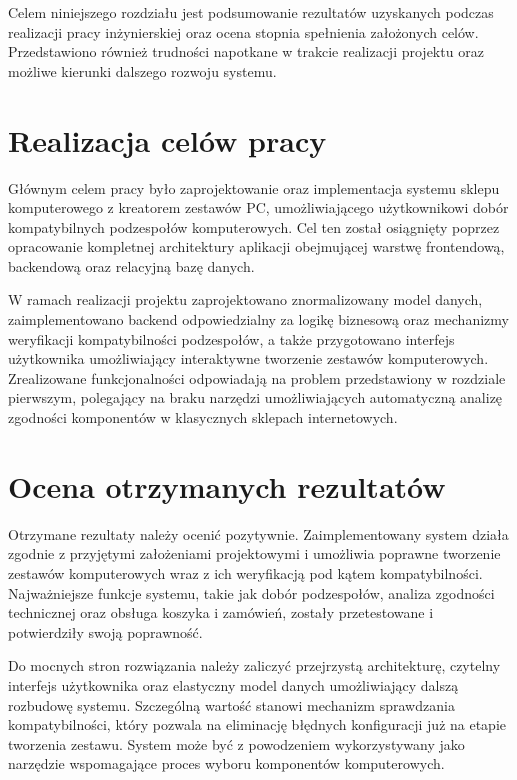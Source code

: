 \documentclass[a4paper,twoside,12pt]{book}
\begin{document}
Celem niniejszego rozdziału jest podsumowanie rezultatów uzyskanych podczas 
realizacji pracy inżynierskiej oraz ocena stopnia spełnienia założonych celów. 
Przedstawiono również trudności napotkane w trakcie realizacji projektu oraz 
możliwe kierunki dalszego rozwoju systemu.

\section{Realizacja celów pracy}

Głównym celem pracy było zaprojektowanie oraz implementacja systemu sklepu 
komputerowego z kreatorem zestawów PC, umożliwiającego użytkownikowi dobór 
kompatybilnych podzespołów komputerowych. Cel ten został osiągnięty poprzez 
opracowanie kompletnej architektury aplikacji obejmującej warstwę 
frontendową, backendową oraz relacyjną bazę danych.

W ramach realizacji projektu zaprojektowano znormalizowany model danych, 
zaimplementowano backend odpowiedzialny za logikę biznesową oraz mechanizmy 
weryfikacji kompatybilności podzespołów, a także przygotowano interfejs 
użytkownika umożliwiający interaktywne tworzenie zestawów komputerowych. 
Zrealizowane funkcjonalności odpowiadają na problem przedstawiony w rozdziale 
pierwszym, polegający na braku narzędzi umożliwiających automatyczną analizę 
zgodności komponentów w klasycznych sklepach internetowych.

\section{Ocena otrzymanych rezultatów}

Otrzymane rezultaty należy ocenić pozytywnie. Zaimplementowany system działa 
zgodnie z przyjętymi założeniami projektowymi i umożliwia poprawne tworzenie 
zestawów komputerowych wraz z ich weryfikacją pod kątem kompatybilności. 
Najważniejsze funkcje systemu, takie jak dobór podzespołów, analiza zgodności 
technicznej oraz obsługa koszyka i zamówień, zostały przetestowane i 
potwierdziły swoją poprawność.

Do mocnych stron rozwiązania należy zaliczyć przejrzystą architekturę, 
czytelny interfejs użytkownika oraz elastyczny model danych umożliwiający 
dalszą rozbudowę systemu. Szczególną wartość stanowi mechanizm sprawdzania 
kompatybilności, który pozwala na eliminację błędnych konfiguracji już na 
etapie tworzenia zestawu. System może być z powodzeniem wykorzystywany jako 
narzędzie wspomagające proces wyboru komponentów komputerowych.
\end{document}
